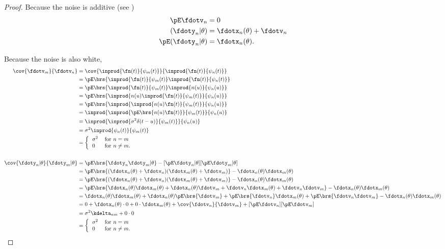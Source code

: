 \begin{proof}
Because the noise is additive (see )
\begin{align*}
   \pE\fdotv_{n}           &= 0  \\
   (\fdoty_n |\theta)      &= \fdotx_n(\theta)  + \fdotv_n \\
   \pE({\fdoty_n} | \theta) &= \fdotx_n(\theta).
\end{align*}

Because the noise is also white,
\begin{align*}
   \cov{\fdotv_m}{\fdotv_n}
      &= \cov{\inprod{\fn(t)}{\psi_m(t)}}{\inprod{\fn(t)}{\psi_n(t)}}
    \\&= \pE\brs{\inprod{\fn(t)}{\psi_m(t)} \inprod{\fn(t)}{\psi_n(t)}}
    \\&= \pE\brs{\inprod{\fn(t)}{\psi_m(t)} \inprod{n(u)}{\psi_n(u)}}
    \\&= \pE\brs{ \inprod{n(u)\inprod{\fn(t)}{\psi_m(t)}}{\psi_n(u)}}
    \\&= \pE\brs{ \inprod{\inprod{n(u)\fn(t)}{\psi_m(t)}}{\psi_n(u)}}
    \\&= \inprod{\inprod{\pE\brs{ n(u)\fn(t)}}{\psi_m(t)}}{\psi_n(u)}
    \\&= \inprod{\inprod{\sigma^2 \delta(t-u)}{\psi_m(t)}}{\psi_n(u)}
    \\&= \sigma^2 \inprod{\psi_n(t)}{\psi_m(t)}
    \\&= \left\{
          \begin{tabular}{ll}
             $\sigma^2$ & for $n=m$ \\
             $0$   & for $n\ne m$.
          \end{tabular}
          \right.
\\
\\
   \cov{\fdoty_n|\theta}{\fdoty_m|\theta }
      &= \pE\brs{\fdoty_n \fdoty_m |\theta} - [\pE\fdoty_n|\theta][\pE\fdoty_m|\theta ]
    \\&= \pE\brs{(\fdotx_n(\theta) +\fdotv_n)(\fdotx_m(\theta) +\fdotv_m)} - \fdotx_n(\theta) \fdotx_m(\theta)
    \\&= \pE\brs{(\fdotx_n(\theta) +\fdotv_n)(\fdotx_m(\theta) +\fdotv_m)} - \fdotx_n(\theta) \fdotx_m(\theta)
    \\&= \pE\brs{\fdotx_n(\theta) \fdotx_m(\theta) +\fdotx_n(\theta) \fdotv_m+ \fdotv_n\fdotx_m(\theta) +\fdotv_n\fdotv_m } - \fdotx_n(\theta) \fdotx_m(\theta)
    \\&= \fdotx_n(\theta) \fdotx_m(\theta) + \fdotx_n(\theta) \pE\brs{\fdotv_m}+ \pE\brs{\fdotv_n}\fdotx_m(\theta) +\pE\brs{\fdotv_n\fdotv_m}  - \fdotx_n(\theta) \fdotx_m(\theta)
    \\&= 0 + \fdotx_n(\theta) \cdot0 + 0\cdot\fdotx_m(\theta) + \cov{\fdotv_n}{\fdotv_m}+[\pE\fdotv_n][\pE\fdotv_m]
    \\&= \sigma^2 \kdelta_{nm} + 0\cdot0
    \\&= \left\{
          \begin{tabular}{ll}
             $\sigma^2$ & for $n=m$ \\
             $0$   & for $n\ne m$.
          \end{tabular}
          \right.
\end{align*}
\end{proof}


